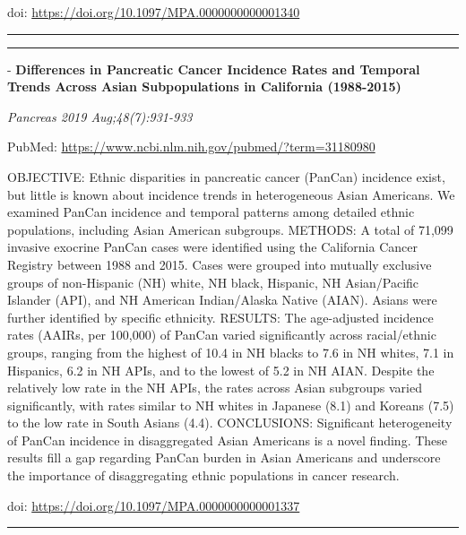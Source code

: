 \documentclass[]{article}
\begin{document}
doi: \url{https://doi.org/10.1097/MPA.0000000000001340}

{}

{}

\begin{center}\rule{0.5\linewidth}{\linethickness}\end{center}

\begin{center}\rule{0.5\linewidth}{\linethickness}\end{center}

 - \textbf{Differences in Pancreatic Cancer Incidence Rates and Temporal
Trends Across Asian Subpopulations in California (1988-2015)}

\emph{Pancreas 2019 Aug;48(7):931-933}

PubMed: \url{https://www.ncbi.nlm.nih.gov/pubmed/?term=31180980}

OBJECTIVE: Ethnic disparities in pancreatic cancer (PanCan) incidence
exist, but little is known about incidence trends in heterogeneous Asian
Americans. We examined PanCan incidence and temporal patterns among
detailed ethnic populations, including Asian American subgroups.
METHODS: A total of 71,099 invasive exocrine PanCan cases were
identified using the California Cancer Registry between 1988 and 2015.
Cases were grouped into mutually exclusive groups of non-Hispanic (NH)
white, NH black, Hispanic, NH Asian/Pacific Islander (API), and NH
American Indian/Alaska Native (AIAN). Asians were further identified by
specific ethnicity. RESULTS: The age-adjusted incidence rates (AAIRs,
per 100,000) of PanCan varied significantly across racial/ethnic groups,
ranging from the highest of 10.4 in NH blacks to 7.6 in NH whites, 7.1
in Hispanics, 6.2 in NH APIs, and to the lowest of 5.2 in NH AIAN.
Despite the relatively low rate in the NH APIs, the rates across Asian
subgroups varied significantly, with rates similar to NH whites in
Japanese (8.1) and Koreans (7.5) to the low rate in South Asians (4.4).
CONCLUSIONS: Significant heterogeneity of PanCan incidence in
disaggregated Asian Americans is a novel finding. These results fill a
gap regarding PanCan burden in Asian Americans and underscore the
importance of disaggregating ethnic populations in cancer research.

doi: \url{https://doi.org/10.1097/MPA.0000000000001337}

{}

{}

\begin{center}\rule{0.5\linewidth}{\linethickness}\end{center}
\end{document}
